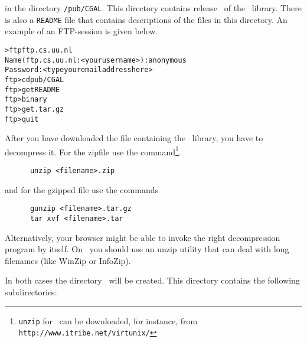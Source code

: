 in the directory \texttt{/pub/CGAL}. This directory contains release
\cgalrelease\ of the \cgal\ library. There is also a \texttt{README}
file that contains descriptions of the files in this directory. An
example of an FTP-session is given below.

\begin{alltt}
      > ftp ftp.cs.uu.nl 
      Name (ftp.cs.uu.nl:<your username>): anonymous
      Password: <type your email address here>
      ftp> cd pub/CGAL
      ftp> get README
      ftp> binary
      ftp> get \cgaldir.tar.gz
      ftp> quit
\end{alltt}

After you have downloaded the file containing the \cgal\ library, you
have to decompress it. For the zipfile use the
command\footnote{\texttt{unzip} for \mswin\ 
can be downloaded, for instance, from
\texttt{http://www.itribe.net/virtunix/}}.

\begin{verbatim}
      unzip <filename>.zip
\end{verbatim}

and for the gzipped file use the commands

\begin{verbatim}
      gunzip <filename>.tar.gz
      tar xvf <filename>.tar
\end{verbatim}

Alternatively, your browser might be able to invoke the right
decompression program by itself.
On \mswin\ you should use an unzip utility that can deal with long
filenames (like WinZip or InfoZip).

In both cases the directory \cgaldir\ will be created. This directory
contains the following subdirectories:

